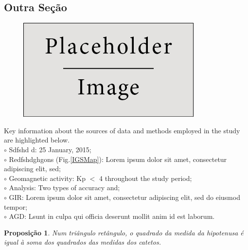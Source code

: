\documentclass[a0,portrait]{a0poster}
\newtheorem{proposition}[theorem]{Proposição}
\begin{document}
\begin{minipage}[c]{\linewidth}
\begin{framed}
\begin{multicols}{2}
\section*{Outra Seção}
\begin{figure} %
\centering
\includegraphics[scale=0.5]{figures/placeholder}
\label{STECchart}
\end{figure}
Key information about the sources of data and methods employed in the study are highlighted below.\\
\hspace{0.1cm}$\circ$ Sdfshd d: 25 January, 2015;\\
\hspace{0.1cm}$\circ$ Redfshdghgons (Fig.\ref{IGSMap}): Lorem ipsum dolor sit amet, consectetur adipiscing elit, sed;\\
\hspace{0.1cm}$\circ$ Geomagnetic activity: Kp $<$ 4 throughout the study period;\\
\hspace{0.1cm}$\circ$ Analysis: Two types of accuracy and;\\
\hspace{0.1cm}$\circ$ GIR: Lorem ipsum dolor sit amet, consectetur adipiscing elit, sed do eiusmod tempor;\\
\hspace{0.1cm}$\circ$ AGD: Lsunt in culpa qui officia deserunt mollit anim id est laborum.\\

\begin{mybox}
\begin{proposition}
Num triângulo retângulo, o quadrado da medida da hipotenusa é igual à soma dos quadrados das medidas dos catetos.
\end{proposition}
\end{mybox}
\color{Black}

\end{multicols}
\end{framed}
\end{minipage}
\end{document}
